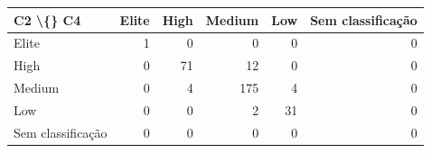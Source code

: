 \begin{tabular}{lrrrrr}
\hline
C2 \textbackslash\{\} C4 & Elite & High & Medium & Low & Sem classificação \\
\hline
Elite & 1 & 0 & 0 & 0 & 0 \\
High & 0 & 71 & 12 & 0 & 0 \\
Medium & 0 & 4 & 175 & 4 & 0 \\
Low & 0 & 0 & 2 & 31 & 0 \\
Sem classificação & 0 & 0 & 0 & 0 & 0 \\
\hline
\end{tabular}
